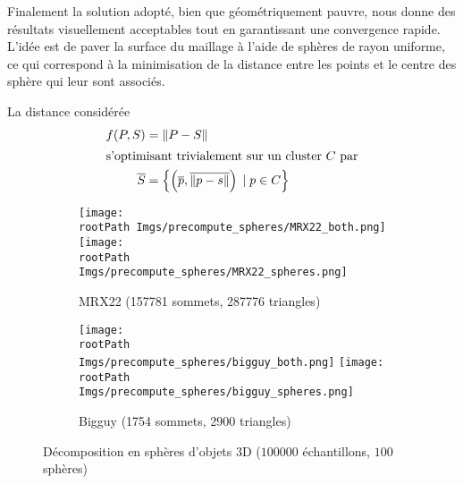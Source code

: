 \documentclass[10pt,a4paper,twoside, twocolumn]{report}
\newcommand*{\rootPath}{../}
\begin{document}
Finalement la solution adopté, bien que géométriquement pauvre, nous donne des résultats visuellement acceptables tout en garantissant une convergence rapide. L'idée est de paver la surface du maillage à l'aide de sphères de rayon uniforme, ce qui correspond à la minimisation de la distance entre les points et le centre des sphère qui leur sont associés.

La distance considérée
\begin{align}
	f(P, S)			&= \left\|P-S\right\|	\\
\intertext{s'optimisant trivialement sur un cluster $C$ par}
	\overline S	&= \left\{ \left(\overline p, \overline{\|p-s\|}\right)\;|\;p \in C \right\}
\end{align}



\begin{figure}[!ht]\centering
	\begin{subfigure}[b]{0.4\textwidth}\centering
		\texttt{[image: \\rootPath Imgs/precompute\_spheres/MRX22\_both.png]}
		\vspace{0.5cm}
		\texttt{[image: \\rootPath Imgs/precompute\_spheres/MRX22\_spheres.png]}
		\caption{MRX22 (157781 sommets, 287776 triangles)}
	\end{subfigure}
	\begin{subfigure}[b]{0.4\textwidth}\centering
		\texttt{[image: \\rootPath Imgs/precompute\_spheres/bigguy\_both.png]}
		\vspace{0.5cm}
		\texttt{[image: \\rootPath Imgs/precompute\_spheres/bigguy\_spheres.png]}
		\caption{Bigguy (1754 sommets, 2900 triangles)}
	\end{subfigure}
	
	\caption{Décomposition en sphères d'objets 3D ($100000$ échantillons, $100$ sphères)}
	\label{fig:precompute_sphere:result}
\end{figure}





\ifstandalone
	
	
\fi
\end{document}
